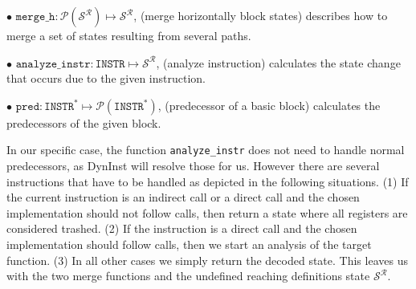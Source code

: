 $\bullet$ $\texttt{merge\_h} : \mathcal{P}(\mathcal{S}^\mathcal{R}) \mapsto \mathcal{S}^\mathcal{R}$, (merge horizontally block states) describes how to merge a set of states resulting from several paths.

$\bullet$ $\texttt{analyze\_instr} : \texttt{INSTR} \mapsto \mathcal{S}^\mathcal{R}$, (analyze instruction) calculates the state change that occurs due to the given instruction.

$\bullet$ $\texttt{pred} : \texttt{INSTR}^* \mapsto \mathcal{P}(\texttt{INSTR}^*)$, (predecessor of a basic block) calculates the predecessors of the given block.

In our specific case, the function \texttt{analyze\_instr} does not need to handle normal predecessors, as DynInst will resolve those for us. 
However there are several instructions that have to be handled as depicted in the following situations. 
(1) If the current instruction is an indirect call or a direct call and the chosen implementation should not follow calls, then return a state where all registers are considered trashed. 
(2) If the instruction is a direct call and the chosen implementation should follow calls, then we start an analysis of the target function. 
(3) In all other cases we simply return the decoded state. This leaves us with the two merge functions and the undefined reaching definitions state $\mathcal{S}^\mathcal{R}$. 


